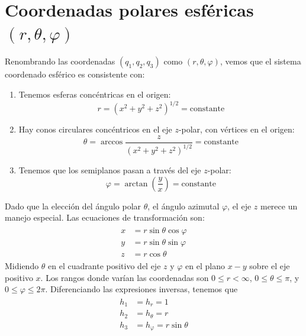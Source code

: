 \section{Coordenadas polares esféricas $(r,\theta, \varphi)$}
Renombrando las coordenadas $(q_{1}, q_{2}, q_{3})$ como $(r, \theta, \varphi)$, vemos que el sistema coordenado esférico es consistente con:
\begin{enumerate}
\item Tenemos esferas concéntricas en el origen:
\[ r = (x^{2} + y^{2} + z^{2})^{1/2} =  \text{constante} \]
\item Hay conos circulares concéntricos en el eje $z$-polar, con vértices en el origen:
\[ \theta = \arccos \dfrac{z}{(x^{2} + y^{2} + z^{2})^{1/2}} = \text{constante}\]
\item Tenemos que los semiplanos pasan a través del eje $z$-polar:
\[ \varphi = \arctan\left(\dfrac{y}{x} \right) =  \text{constante}\]
\end{enumerate}
Dado que la elección del ángulo polar $\theta$, el ángulo azimutal $\varphi$, el eje $z$ merece un manejo especial. Las ecuaciones de transformación son:
\begin{align*}
\begin{aligned}
x &= r \sin \theta \cos \varphi \\
y &= r \sin \theta \sin \varphi \\
z &= r \cos \theta
\end{aligned}
\end{align*}
Midiendo $\theta$ en el cuadrante positivo del eje $z$ y $\varphi$ en el plano $x-y$ sobre el eje positivo $x$. Los rangos donde varían las coordenadas son $0 \leq r < \infty$, $0 \leq \theta \leq \pi$, y $ 0 \leq \varphi \leq 2 \pi$. Diferenciando las expresiones inversas, tenemos que 
\begin{align*}
\begin{aligned}
h_{1} &= h_{r} = 1 \\
h_{2} &= h_{\theta} = r \\
h_{3} &= h_{\varphi} = r \sin \theta 
\end{aligned}
\end{align*}
